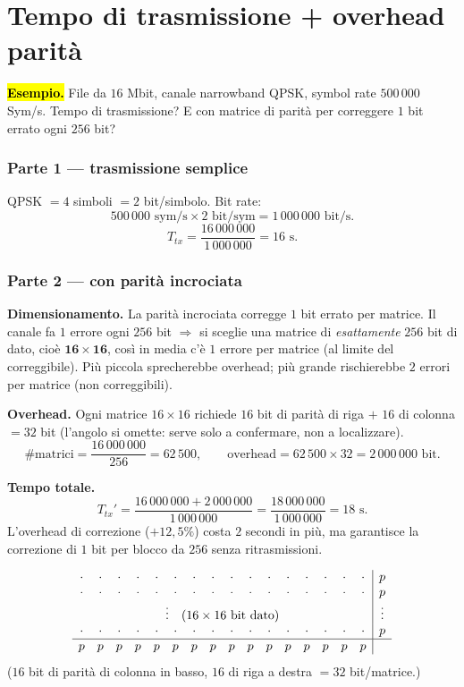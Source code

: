 \documentclass[11pt,a4paper]{report}
\begin{document}
\section{Tempo di trasmissione + overhead parità}
\label{teoria:txparity}
\hl{\textbf{Esempio.}} File da
$16$ Mbit, canale narrowband QPSK, symbol rate $500\,000$ Sym/s. Tempo di
trasmissione? E con matrice di parità per correggere $1$ bit errato ogni $256$ bit?

\subsubsection*{Parte 1 --- trasmissione semplice}
QPSK $= 4$ simboli $= 2$ bit/simbolo. Bit rate:
\[
500\,000 \text{ sym/s} \times 2 \text{ bit/sym} = 1\,000\,000 \text{ bit/s}.
\]
\[
T_{tx} = \frac{16\,000\,000}{1\,000\,000} = \boxed{16 \text{ s}}.
\]

\subsubsection*{Parte 2 --- con parità incrociata}
\textbf{Dimensionamento.} La parità incrociata corregge $1$ bit errato per
matrice. Il canale fa $1$ errore ogni $256$ bit $\Rightarrow$ si sceglie una
matrice di \emph{esattamente} $256$ bit di dato, cioè $\mathbf{16 \times 16}$,
così in media c'è $1$ errore per matrice (al limite del correggibile). Più
piccola sprecherebbe overhead; più grande rischierebbe $2$ errori per matrice
(non correggibili).

\textbf{Overhead.} Ogni matrice $16\times16$ richiede $16$ bit di parità di riga
$+$ $16$ di colonna $= 32$ bit (l'angolo si omette: serve solo a confermare, non
a localizzare).
\[
\#\text{matrici} = \frac{16\,000\,000}{256} = 62\,500,
\qquad
\text{overhead} = 62\,500 \times 32 = 2\,000\,000 \text{ bit}.
\]

\textbf{Tempo totale.}
\[
T_{tx}' = \frac{16\,000\,000 + 2\,000\,000}{1\,000\,000}
= \frac{18\,000\,000}{1\,000\,000} = \boxed{18 \text{ s}}.
\]
L'overhead di correzione ($+12{,}5\%$) costa $2$ secondi in più, ma garantisce
la correzione di $1$ bit per blocco da $256$ senza ritrasmissioni.

\[
\begin{array}{cccccccccccccccc|c}
\cdot&\cdot&\cdot&\cdot&\cdot&\cdot&\cdot&\cdot&\cdot&\cdot&\cdot&\cdot&\cdot&\cdot&\cdot&\cdot& p\\
\cdot&\cdot&\cdot&\cdot&\cdot&\cdot&\cdot&\cdot&\cdot&\cdot&\cdot&\cdot&\cdot&\cdot&\cdot&\cdot& p\\
\multicolumn{16}{c|}{\vdots\quad(16\times16\ \text{bit dato})} & \vdots\\
\cdot&\cdot&\cdot&\cdot&\cdot&\cdot&\cdot&\cdot&\cdot&\cdot&\cdot&\cdot&\cdot&\cdot&\cdot&\cdot& p\\ \hline
p&p&p&p&p&p&p&p&p&p&p&p&p&p&p&p&
\end{array}
\]
\noindent ($16$ bit di parità di colonna in basso, $16$ di riga a destra $= 32$ bit/matrice.)
\end{document}
